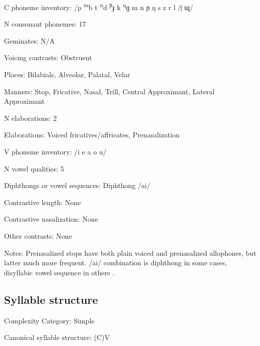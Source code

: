 {\begin{appendixdesc}
\item[C phoneme inventory:] /p \textsuperscript{m}b t \textsuperscript{n}d \textsuperscript{ɲ}ɟ k \textsuperscript{ŋ}ɡ m n ɲ ŋ s z r l $\beta ̞$ ɰ/

\item[N consonant phonemes:] 17

\item[Geminates:] N/A

\item[Voicing contrasts:] Obstruent

\item[Places:] Bilabials, Alveolar, Palatal, Velar

\item[Manners:] Stop, Fricative, Nasal, Trill, Central Approximant, Lateral Approximant

\item[N elaborations:] 2

\item[Elaborations:] Voiced fricatives/affricates, Prenasalization

\item[V phoneme inventory:] /i e a o u/

\item[N vowel qualities:] 5

\item[Diphthongs or vowel sequences:] Diphthong /ai/

\item[Contrastive length:] None

\item[Contrastive nasalization:] None

\item[Other contrasts:] None

\item[Notes:] Prenasalized stops have both plain voiced and prenasalized allophones, but latter much more frequent. /ai/ combination is diphthong in some cases, disyllabic vowel sequence in others \citep[22]{Wegener2008}.
\end{appendixdesc}
\subsection*{Syllable structure}
\begin{appendixdesc}

\item[Complexity Category:] Simple

\item[Canonical syllable structure:] (C)V \citep[23--24]{Wegener2008}


\end{appendixdesc}}
